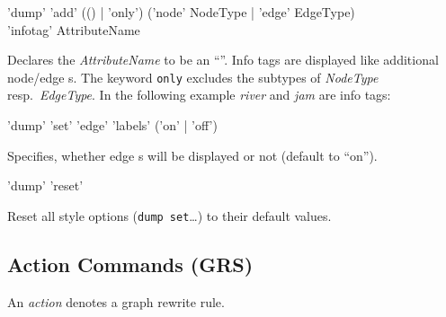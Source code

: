 \begin{rail}
  'dump' 'add' (() | 'only') ('node' NodeType | 'edge' EdgeType) \\ 'infotag' AttributeName
\end{rail}
Declares the  \emph{AttributeName} to be an ``''. Info tags are displayed like additional node/edge s. The keyword \texttt{only} excludes the subtypes of \emph{NodeType} resp.\ \emph{EdgeType}. In the following example \emph{river} and \emph{jam} are info tags:
\begin{center}
\end{center}


\begin{rail}
  'dump' 'set' 'edge' 'labels' ('on' | 'off')
\end{rail}
Specifies, whether edge s will be displayed or not (default to ``on'').

\begin{rail}
  'dump' 'reset'
\end{rail}
Reset all style options (\texttt{dump set}\dots) to their default values.

\subsection{Action Commands (GRS)}
\label{grsthings}
An \emph{action} denotes a graph rewrite rule.

